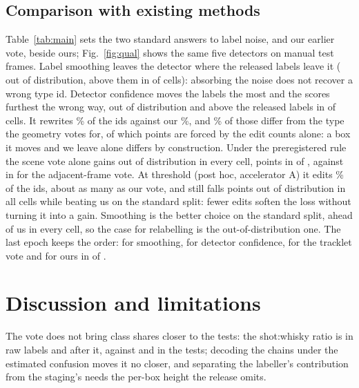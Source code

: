 \documentclass{article}
\begin{document}
\subsection{Comparison with existing methods}
\label{sec:pairs}
Table~\ref{tab:main} sets the two standard answers to label noise, and our earlier vote, beside ours; Fig.~\ref{fig:qual} shows the same five detectors on manual test frames. Label smoothing leaves the detector where the released labels leave it (\BaseLsOODGain{} out of distribution, above them in \BaseLsOODPos{} of \SvCells{} cells): absorbing the noise does not recover a wrong type id. Detector confidence moves the labels the most and the scores furthest the wrong way, \BaseCfOODGain{} out of distribution and above the released labels in \BaseCfOODPos{} of \SvCells{} cells. It rewrites \ConfidChangedPct\% of the ids against our \SceneChangedRosterPct\%, and \ConfidVsSceneDisagreePct\% of those differ from the type the geometry votes for, of which \ConfidFloorPct{} points are forced by the edit counts alone: a box it moves and we leave alone differs by construction. Under the preregistered rule the scene vote alone gains out of distribution in every cell, \BaseSvOODGain{} points in \BaseSvOODPos{} of \SvCells, against \BaseTrkOODGain{} in \BaseTrkOODPos{} for the adjacent-frame vote. At threshold \ConfidTauHigh{} (post hoc, accelerator A) it edits \ConfidTauHighChangedPct\% of the ids, about as many as our vote, and still falls \ConfidTauHighOODDrop{} points out of distribution in all \ConfidTauHighCells{} cells while beating us on the standard split: fewer edits soften the loss without turning it into a gain. Smoothing is the better choice on the standard split, ahead of us in every cell, so the case for relabelling is the out-of-distribution one. The last epoch keeps the order: \LastLsOODGain{} for smoothing, \LastCfOODGain{} for detector confidence, \TrkLSixOODVsRawGainL{} for the tracklet vote and \LastSvOODGain{} for ours in \LastSvOODPos{} of \SvCells.

\section{Discussion and limitations}
\label{sec:limits}
The vote does not bring class shares closer to the tests: the shot:whisky ratio is \RatioRawTrain{} in raw labels and \RatioSceneTrain{} after it, against \RatioManualStd{} and \RatioManualOOD{} in the tests; decoding the chains under the estimated confusion moves it no closer, and separating the labeller's contribution from the staging's needs the per-box height the release omits.
\end{document}

